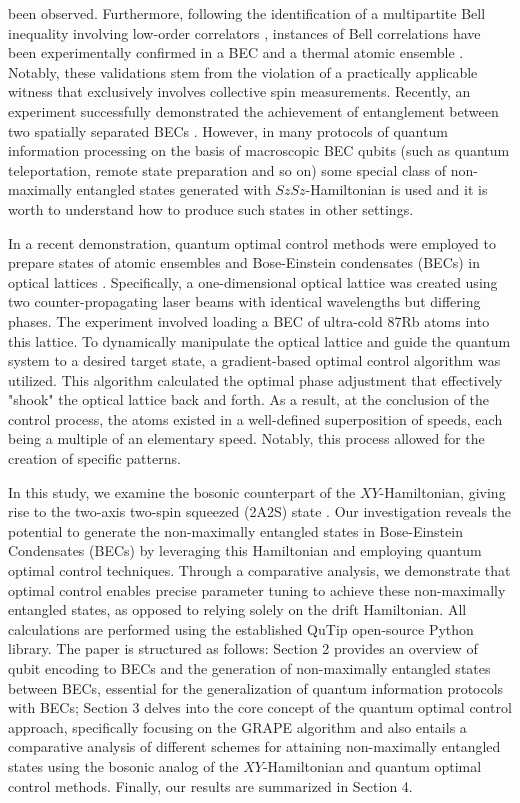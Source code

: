 \documentclass[
aps,%
12pt,%
final,%
notitlepage,%
oneside,%
onecolumn,%
nobibnotes,%
nofootinbib,%
superscriptaddress,%
noshowpacs,%
centertags]%
{revtex4}
\begin{document}
been observed. Furthermore, following the identification of a multipartite Bell inequality involving low-order correlators \cite{Tura2014}, instances of Bell correlations have been experimentally confirmed in a BEC \cite{schmied2016bell} and a thermal atomic ensemble \cite{engelsen2017}. Notably, these validations stem from the violation of a practically applicable witness that exclusively involves collective spin measurements. Recently, an experiment successfully demonstrated the achievement of entanglement between two spatially separated BECs \cite{Colciaghi2023}. However, in many protocols of quantum information processing on the basis of macroscopic BEC qubits (such as quantum teleportation, remote state preparation and so on) some special class of non-maximally entangled states generated with $SzSz$-Hamiltonian is used \cite{BYRNES2015102,pyrkov2014quantum,pyrkov2014full,manish2021} and it is worth to understand how to produce such states in other settings.

In a recent demonstration, quantum optimal control methods were employed to prepare states of atomic ensembles and Bose-Einstein condensates (BECs) in optical lattices \cite{Dupont2021}. Specifically, a one-dimensional optical lattice was created using two counter-propagating laser beams with identical wavelengths but differing phases. The experiment involved loading a BEC of ultra-cold 87Rb atoms into this lattice. To dynamically manipulate the optical lattice and guide the quantum system to a desired target state, a gradient-based optimal control algorithm was utilized. This algorithm calculated the optimal phase adjustment that effectively "shook" the optical lattice back and forth. As a result, at the conclusion of the control process, the atoms existed in a well-defined superposition of speeds, each being a multiple of an elementary speed. Notably, this process allowed for the creation of specific patterns.

In this study, we examine the bosonic counterpart of the $XY$-Hamiltonian, giving rise to the two-axis two-spin squeezed (2A2S) state \cite{bec4}. Our investigation reveals the potential to generate the non-maximally entangled states in Bose-Einstein Condensates (BECs) by leveraging this Hamiltonian and employing quantum optimal control techniques. Through a comparative analysis, we demonstrate that optimal control enables precise parameter tuning to achieve these non-maximally entangled states, as opposed to relying solely on the drift Hamiltonian. All calculations are performed using the established QuTip open-source Python library. The paper is structured as follows: Section 2 provides an overview of qubit encoding to BECs and the generation of non-maximally entangled states between BECs, essential for the generalization of quantum information protocols with BECs; Section 3 delves into the core concept of the quantum optimal control approach, specifically focusing on the GRAPE algorithm and also entails a comparative analysis of different schemes for attaining non-maximally entangled states using the bosonic analog of the $XY$-Hamiltonian and quantum optimal control methods. Finally, our results are summarized in Section 4.
\end{document}
